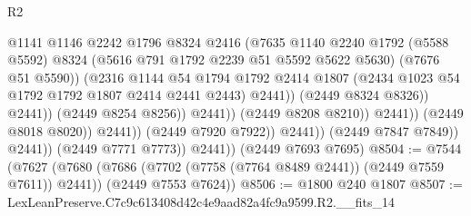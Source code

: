 \begin{lexlean}{R2}
\begin{coremodule}
                                                @1141
                                                @1146
                                                @2242
                                                @1796
                                                @8324
                                                @2416
                                                (@7635
                                                  @1140
                                                  @2240
                                                  @1792
                                                  (@5588 @5592)
                                                  @8324
                                                  (@5616 @791 @1792 @2239 @51 @5592 @5622 @5630)
                                                  (@7676 @51 @5590))
                                                (@2316
                                                  @1144
                                                  @54
                                                  @1794
                                                  @1792
                                                  @2414
                                                  @1807
                                                  (@2434
                                                    @1023
                                                    @54
                                                    @1792
                                                    @1792
                                                    @1807
                                                    @2414
                                                    @2441
                                                    @2443)
                                                  @2441))
                                              (@2449 @8324 @8326))
                                            @2441))
                                        (@2449 @8254 @8256))
                                      @2441))
                                  (@2449 @8208 @8210))
                                @2441))
                            (@2449 @8018 @8020))
                          @2441))
                      (@2449 @7920 @7922))
                    @2441))
                (@2449 @7847 @7849))
              @2441))
          (@2449 @7771 @7773))
        @2441))
    (@2449 @7693 @7695)
@8504 := @7544
    (@7627
      (@7680 (@7686 (@7702 (@7758 (@7764 @8489 @2441)) (@2449 @7559 @7611)) @2441))
      (@2449 @7553 @7624))
@8506 := @1800 @240 @1807
@8507 := LexLeanPreserve.C7c9c613408d42c4e9aad82a4fc9a9599.R2.__fits_14

\end{coremodule}
\end{lexlean}

